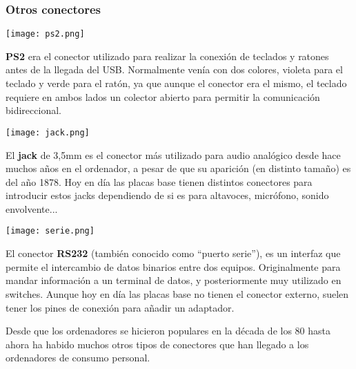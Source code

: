 \subsubsection{Otros conectores}

\vspace{12pt}
\begin{minipage}{0.15\linewidth}
    \texttt{[image: ps2.png]}
\end{minipage}
\hfill
\begin{minipage}{0.8\linewidth}
    \textbf{PS\/2} era el conector utilizado para realizar la conexión de teclados y ratones antes de la llegada del USB. Normalmente venía con dos colores, violeta para el teclado y verde para el ratón, ya que aunque el conector era el mismo, el teclado requiere en ambos lados un colector abierto para permitir la comunicación bidireccional.
\end{minipage}

\vspace{12pt}
\begin{minipage}{0.15\linewidth}
    \texttt{[image: jack.png]}
\end{minipage}
\hfill
\begin{minipage}{0.8\linewidth}
    El \textbf{jack} de 3,5mm es el conector más utilizado para audio analógico desde hace muchos años en el ordenador, a pesar de que su aparición (en distinto tamaño) es del año 1878. Hoy en día las placas base tienen distintos conectores para introducir estos jacks dependiendo de si es para altavoces, micrófono, sonido envolvente...
\end{minipage}


\vspace{12pt}
\begin{minipage}{0.15\linewidth}
    \texttt{[image: serie.png]}
\end{minipage}
\hfill
\begin{minipage}{0.8\linewidth}
    El conector \textbf{RS232} (también conocido como “puerto serie”), es un interfaz que permite el intercambio de datos binarios entre dos equipos. Originalmente para mandar información a un terminal de datos, y posteriormente muy utilizado en switches. Aunque hoy en día las placas base no tienen el conector externo, suelen tener los pines de conexión para añadir un adaptador.
\end{minipage}


Desde que los ordenadores se hicieron populares en la década de los 80 hasta ahora ha habido muchos otros tipos de conectores que han llegado a los ordenadores de consumo personal.

